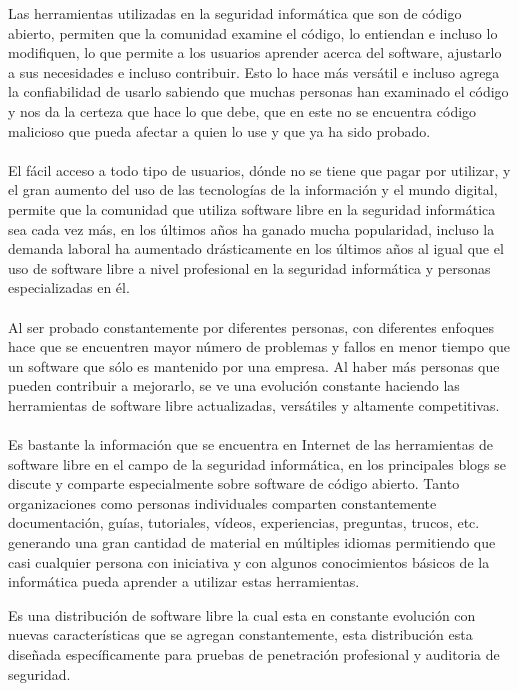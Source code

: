 \begin{multicols}{2}

Las herramientas utilizadas en la seguridad informática que son de código abierto, permiten que la comunidad examine el código, lo entiendan e incluso lo modifiquen, lo que permite a los usuarios aprender acerca del software, ajustarlo a sus necesidades e incluso contribuir. Esto lo hace más versátil e incluso agrega la confiabilidad de usarlo sabiendo que muchas personas han examinado el código y nos da la certeza que hace lo que debe, que en este no se encuentra código malicioso que pueda afectar a quien lo use y que ya ha sido probado.
\\
\\
El fácil acceso a todo tipo de usuarios, dónde no se tiene que pagar por utilizar, y el gran aumento del uso de las tecnologías de la información y el mundo digital, permite que la comunidad que utiliza software libre en la seguridad informática sea cada vez más, en los últimos años ha ganado mucha popularidad, incluso la demanda laboral ha aumentado drásticamente en los últimos años al igual que el uso de software libre a nivel profesional en la seguridad informática y personas especializadas en él.
\\
\\
Al ser probado constantemente por diferentes personas, con diferentes enfoques hace que se encuentren mayor número de problemas y fallos en menor tiempo que un software que sólo es mantenido por una empresa. Al haber más personas que pueden contribuir a mejorarlo, se ve una evolución constante haciendo las herramientas de software libre actualizadas, versátiles y altamente competitivas.
\\
\\
Es bastante la información que se encuentra en Internet de las herramientas de software libre en el campo de la seguridad informática, en los principales blogs se discute y comparte especialmente sobre software de código abierto. Tanto organizaciones como personas individuales comparten constantemente documentación, guías, tutoriales, vídeos, experiencias, preguntas, trucos, etc. generando una gran cantidad de material en múltiples idiomas permitiendo que casi cualquier persona con iniciativa y con algunos conocimientos básicos de la informática pueda aprender a utilizar estas herramientas.\\


Es una distribución de software libre la cual esta en constante evolución con nuevas características que se agregan constantemente, esta distribución esta diseñada específicamente para pruebas de penetración profesional y auditoria de seguridad.\\


\end{multicols}
